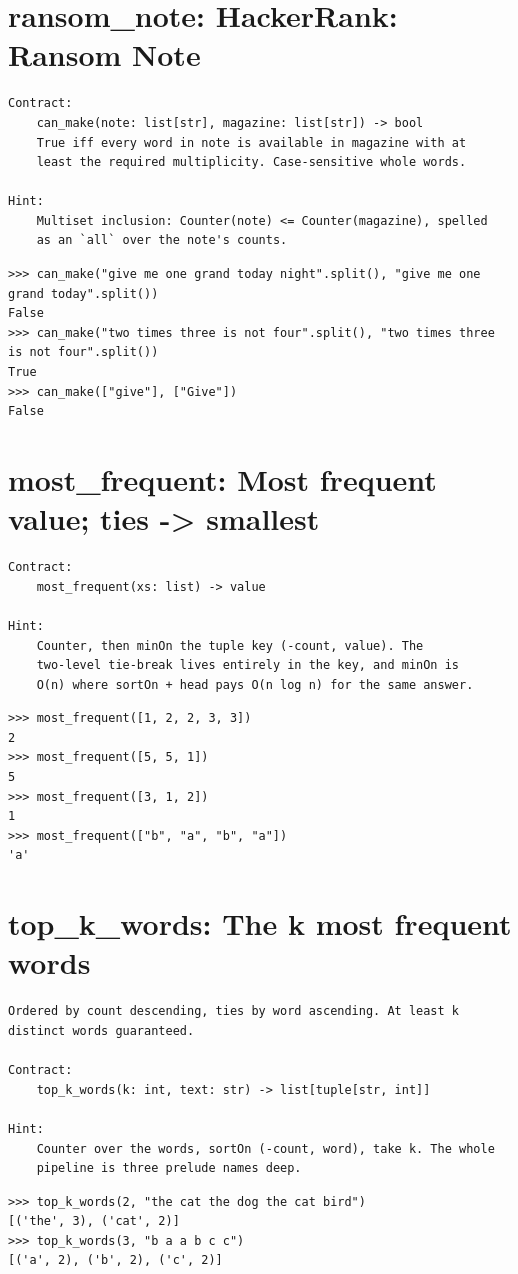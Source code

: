 \documentclass[10pt,letterpaper]{book}
\begin{document}
\section{ransom\_note: HackerRank: Ransom Note}
\begin{lstlisting}[style=ex]
Contract:
    can_make(note: list[str], magazine: list[str]) -> bool
    True iff every word in note is available in magazine with at
    least the required multiplicity. Case-sensitive whole words.

Hint:
    Multiset inclusion: Counter(note) <= Counter(magazine), spelled
    as an `all` over the note's counts.
\end{lstlisting}
\begin{lstlisting}[style=ex]
>>> can_make("give me one grand today night".split(), "give me one grand today".split())
False
>>> can_make("two times three is not four".split(), "two times three is not four".split())
True
>>> can_make(["give"], ["Give"])
False
\end{lstlisting}

\section{most\_frequent: Most frequent value; ties -> smallest}
\begin{lstlisting}[style=ex]
Contract:
    most_frequent(xs: list) -> value

Hint:
    Counter, then minOn the tuple key (-count, value). The
    two-level tie-break lives entirely in the key, and minOn is
    O(n) where sortOn + head pays O(n log n) for the same answer.
\end{lstlisting}
\begin{lstlisting}[style=ex]
>>> most_frequent([1, 2, 2, 3, 3])
2
>>> most_frequent([5, 5, 1])
5
>>> most_frequent([3, 1, 2])
1
>>> most_frequent(["b", "a", "b", "a"])
'a'
\end{lstlisting}

\section{top\_k\_words: The k most frequent words}
\begin{lstlisting}[style=ex]
Ordered by count descending, ties by word ascending. At least k
distinct words guaranteed.

Contract:
    top_k_words(k: int, text: str) -> list[tuple[str, int]]

Hint:
    Counter over the words, sortOn (-count, word), take k. The whole
    pipeline is three prelude names deep.
\end{lstlisting}
\begin{lstlisting}[style=ex]
>>> top_k_words(2, "the cat the dog the cat bird")
[('the', 3), ('cat', 2)]
>>> top_k_words(3, "b a a b c c")
[('a', 2), ('b', 2), ('c', 2)]
\end{lstlisting}
\end{document}
